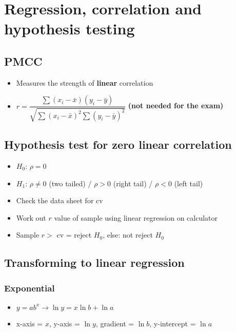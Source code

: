 	\chapter{Regression, correlation and hypothesis testing}

\section{PMCC}
\begin{itemize}
	\item Measures the strength of \textbf{linear} correlation
	\item $r =\dfrac{\sum\left(x_{i}-\bar{x}\right)\left(y_{i}-\bar{y}\right)}{\sqrt{\sum\left(x_{i}-\bar{x}\right)^{2} \sum\left(y_{i}-\bar{y}\right)^{2}}}$ \textbf{(not needed for the exam)}
\end{itemize}

\section{Hypothesis test for zero linear correlation}
\begin{itemize}
	\item $H_0$: $\rho = 0$
	\item $H_1$: $\rho \neq 0$ (two tailed) / $\rho > 0$ (right tail) / $\rho < 0$ (left tail)
	\item Check the data sheet for cv
	\item Work out $r$ value of sample using linear regression on calculator
	\item Sample $r >$ cv = reject $H_0$, else: not reject $H_0$
\end{itemize}







\section{Transforming to linear regression}
\subsection{Exponential}
\begin{itemize}
	\item $y=ab^x\rightarrow\ln y = x\ln b + \ln a$
	\item x-axis = $x$, y-axis = $\ln y$, gradient = $\ln b$, y-intercept = $\ln a$
\end{itemize}
